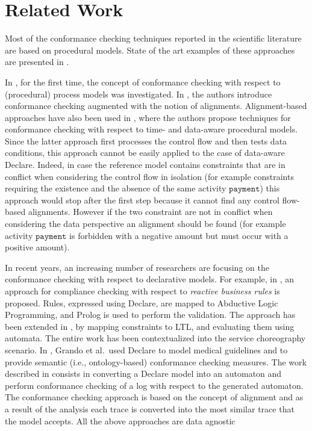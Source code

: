 \section{Related Work}
\label{sec:related}

Most of the conformance checking techniques reported in the scientific literature are based on procedural models. State of the art examples of these approaches are presented in \cite{DBLP:journals/tosem/CookW99,DBLP:journals/is/RozinatA08,DBLP:conf/edoc/AdriansyahDA11,DeLeoni2013,BPM-14-07,DBLP:conf/apn/Aalst12,DBLP:journals/dpd/Aalst13,DBLP:conf/otm/LeoniMCA14,DBLP:journals/is/Munoz-GamaCA14,Knuplesch2010,Awad2009:Compliance,RamezaniTaghiabadi2013,Taghiabadi2014}.

In \cite{DBLP:journals/tosem/CookW99,DBLP:journals/is/RozinatA08}, for the first time, the concept of conformance checking with respect to (procedural) process models was investigated. In \cite{DBLP:conf/edoc/AdriansyahDA11}, the authors introduce conformance checking augmented with the notion of alignments.
Alignment-based approaches have also been used in \cite{DeLeoni2013,BPM-14-07,RamezaniTaghiabadi2013,Taghiabadi2014}, where the authors propose techniques for conformance checking with respect to time- and data-aware procedural models.
Since the latter approach first processes the control flow and then tests data conditions, this approach cannot be easily applied to the case of data-aware Declare. Indeed, in case the reference model contains constraints that are in conflict when considering the control flow in isolation (for example constraints requiring the existence and the absence of the same activity $\texttt{payment}$) this approach would stop after the first step because it cannot find any control flow-based alignments. However if the two constraint are not in conflict when considering the data perspective an alignment should be found (for example activity $\texttt{payment}$ is forbidden with a negative amount but must occur with a positive amount).


In recent years, an increasing number of researchers are focusing on the conformance checking with respect to declarative models.
For example, in \cite{Chesani2009}, an approach for compliance checking with respect to \emph{reactive business rules} is proposed. Rules, expressed using Declare, are mapped to Abductive Logic Programming, and Prolog is used to perform the validation. The approach has been extended in \cite{Montali2010:Choreographies}, by mapping constraints to LTL, and evaluating them using automata. The entire work has been contextualized into the service choreography scenario. In \cite{Grando2012,Grando2013}, Grando et al.\ used Declare to model medical guidelines and to provide semantic (i.e., ontology-based) conformance checking measures.
The work described in \cite{Leoni2012,DeLeoni2014} consists in converting a Declare model into an automaton and perform conformance checking of a log with respect to the generated automaton. The conformance checking approach is based on the concept of alignment and as a result of the analysis each trace is converted into the most similar trace that the model accepts. All the above approaches are data agnostic


